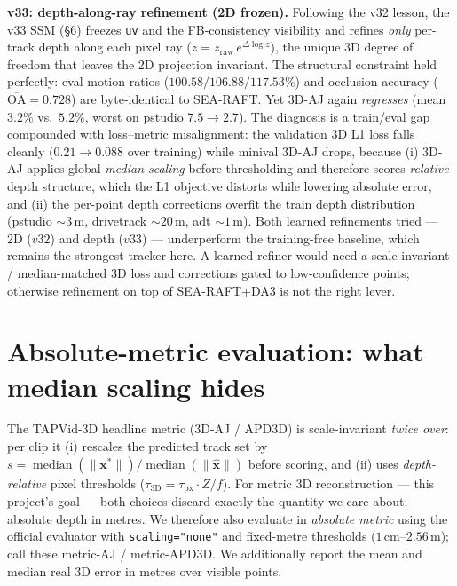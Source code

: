 \documentclass[11pt,a4paper]{article}
\begin{document}
\medskip
\noindent \textbf{v33: depth-along-ray refinement (2D frozen).} Following the
v32 lesson, the v33 SSM (\S6) freezes \texttt{uv} and the FB-consistency
visibility and refines \emph{only} per-track depth along each pixel ray
($z = z_{\text{raw}}\,e^{\Delta\log z}$), the unique 3D degree of freedom that
leaves the 2D projection invariant. The structural constraint held perfectly:
eval motion ratios ($100.58/106.88/117.53\%$) and occlusion accuracy
($\overline{\text{OA}}=0.728$) are byte-identical to SEA-RAFT. Yet 3D-AJ again
\emph{regresses} (mean $3.2\%$ vs.\ $5.2\%$, worst on pstudio $7.5\!\to\!2.7$).
The diagnosis is a train/eval gap compounded with loss–metric misalignment: the
validation 3D L1 loss falls cleanly ($0.21\!\to\!0.088$ over training) while
minival 3D-AJ drops, because (i) 3D-AJ applies global \emph{median scaling}
before thresholding and therefore scores \emph{relative} depth structure, which
the L1 objective distorts while lowering absolute error, and (ii) the per-point
depth corrections overfit the train depth distribution (pstudio ${\sim}3$\,m,
drivetrack ${\sim}20$\,m, adt ${\sim}1$\,m). Both learned refinements tried ---
2D ($v32$) and depth ($v33$) --- underperform the training-free baseline, which
remains the strongest tracker here. A learned refiner would need a
scale-invariant / median-matched 3D loss and corrections gated to
low-confidence points; otherwise refinement on top of SEA-RAFT+DA3 is not the
right lever.

\section{Absolute-metric evaluation: what median scaling hides}

The TAPVid-3D headline metric (3D-AJ / APD3D) is scale-invariant \emph{twice
over}: per clip it (i) rescales the predicted track set by
$s=\operatorname{median}(\lVert\mathbf{x}^{*}\rVert)/\operatorname{median}(\lVert\hat{\mathbf{x}}\rVert)$
before scoring, and (ii) uses \emph{depth-relative} pixel thresholds
($\tau_{\text{3D}}=\tau_{\text{px}}\cdot Z/f$). For metric 3D reconstruction ---
this project's goal --- both choices discard exactly the quantity we care about:
absolute depth in metres. We therefore also evaluate in \emph{absolute metric}
using the official evaluator with \texttt{scaling="none"} and fixed-metre
thresholds ($1$\,cm--$2.56$\,m); call these metric-AJ / metric-APD3D. We
additionally report the mean and median real 3D error in metres over visible
points.
\end{document}
